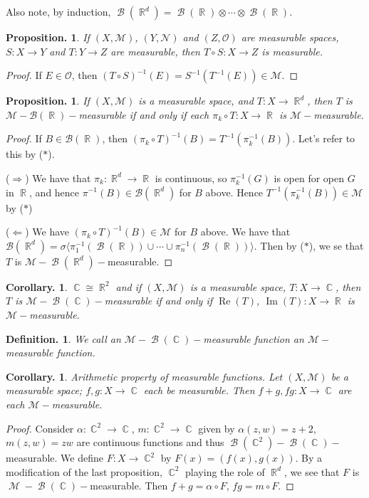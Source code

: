 \documentclass[11pt, a4paper]{memoir}
\DeclareMathOperator{\R}{{\mathbb{R}}}
\DeclareMathOperator{\C}{{\mathbb{C}}}
\theoremstyle{change}
\newtheorem{corollary}[theorem]{Corollary.}
\newtheorem{proposition}[theorem]{Proposition.}
\theoremstyle{plain}
\theoremstyle{nonumberplain}
\newtheorem{definition}{Definition.}
\newtheorem{proof}{Proof}
\DeclareMathOperator{\M}{{\mathcal{M}}}
\DeclareMathOperator{\B}{{\mathcal{B}}}
\renewcommand{\Re}{\ensuremath{\operatorname{Re}}}
\renewcommand{\Im}{\ensuremath{\operatorname{Im}}}
\begin{document}
Also note, by induction, $\B(\R^d)=\B(\R)\otimes\cdots\otimes\B(\R)$.
\begin{proposition}
    If $(X,\mathcal{M})$, $(Y,\mathcal{N})$ and $(Z,\mathcal{O})$ are measurable spaces, $S:X\to Y$ and $T:Y\to Z$ are measurable, then $T\circ S:X\to Z$ is measurable.
\end{proposition}
\begin{proof}
    If $E\in\mathcal{O}$, then $(T\circ S)^{-1}(E)=S^{-1}(T^{-1}(E))\in\mathcal{M}$.
\end{proof}
\begin{proposition}
    If $(X,\mathcal{M})$ is a measurable space, and $T:X\to\R^d$, then $T$ is $\mathcal{M}-\mathcal{B}(\R)-$measurable if and only if each $\pi_k\circ T:X\to\R$ is $\mathcal{M}-$measurable.
\end{proposition}
\begin{proof}
    If $B\in\mathcal{B}(\R)$, then $(\pi_k\circ T)^{-1}(B)=T^{-1}(\pi_k^{-1}(B))$.
    Let's refer to this by ($*$).

    ($\Rightarrow$) We have that $\pi_k:\R^d\to\R$ is continuous, so $\pi_k^{-1}(G)$ is open for open $G$ in $\R$, and hence $\pi^{-1}(B)\in\mathcal{B}(\R^d)$ for $B$ above.
    Hence $T^{-1}(\pi_k^{-1}(B))\in\mathcal{M}$ by ($*$)

    ($\Leftarrow$) We have $(\pi_k\circ T)^{-1}(B)\in\mathcal{M}$ for $B$ above.
    We have that $\mathcal{B}(\R^d)=\sigma\langle\pi_1^{-1}(\B(\R))\cup\cdots\cup\pi_n^{-1}(\B(\R))\rangle$.
    Then by ($*$), we se that $T$ is $\mathcal{M}-\B(\R^d)-$measurable.
\end{proof}
\begin{corollary}
    $\C\cong\R^2$ and if $(X,\mathcal{M})$ is a measurable space, $T:X\to\C$, then $T$ is $\mathcal{M}-\B(\C)-$measurable if and only if $\Re(T)$, $\Im(T):X\to\R$ is $\mathcal{M}-$measurable.
\end{corollary}
\begin{definition}
    We call an $\mathcal{M}-\B(\C)-$measurable function an $\mathcal{M}-$measurable function.
\end{definition}
\begin{corollary}
    Arithmetic property of measurable functions.
    Let $(X,\mathcal{M})$ be a measurable space; $f,g:X\to\C$ each be measurable.
    Then $f+g,fg:X\to\C$ are each $\mathcal{M}-$measurable.
\end{corollary}
\begin{proof}
    Consider $\alpha:\C^2\to\C$, $m:\C^2\to\C$ given by $\alpha(z,w)=z+2$, $m(z,w)=zw$ are continuous functions and thus $\B(\C^2)-\B(\C)-$measurable.
    We define $F:X\to\C^2$ by $F(x)=(f(x),g(x))$.
    By a modification of the last proposition, $\C^2$ playing the role of $\R^d$, we see that $F$ is $\M-\B(\C)-$measurable.
    Then $f+g=\alpha\circ F$, $fg=m\circ F$.
\end{proof}
\end{document}
